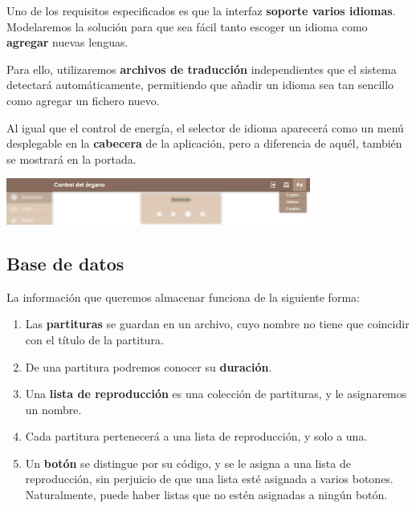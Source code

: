 \documentclass[10pt,a4paper]{article}
\begin{document}
	Uno de los requisitos especificados es que la interfaz \textbf{soporte varios idiomas}. Modelaremos la solución para que sea fácil tanto escoger un idioma como \textbf{agregar} nuevas lenguas.
	
	Para ello, utilizaremos \textbf{archivos de traducción} independientes que el sistema detectará automáticamente, permitiendo que añadir un idioma sea tan sencillo como agregar un fichero nuevo.
	
	Al igual que el control de energía, el selector de idioma aparecerá como un menú desplegable en la \textbf{cabecera} de la aplicación, pero a diferencia de aquél, también se mostrará en la portada.
	
	\begin{center}
		\includegraphics[width=0.75\textwidth]{images/cap_repr_idiomas} 
	\end{center}
	
	
	\subsection{Base de datos}
	\label{subsec:database}
	
	La información que queremos almacenar funciona de la siguiente forma:
	
	\begin{enumerate}
		\item Las \textbf{partituras} se guardan en un archivo, cuyo nombre no tiene que coincidir con el título de la partitura.
		\item De una partitura podremos conocer su \textbf{duración}.
		\item Una \textbf{lista de reproducción} es una colección de partituras, y le asignaremos un nombre.
		\item Cada partitura pertenecerá a una lista de reproducción, y solo a una.
		\item Un \textbf{botón} se distingue por su código, y se le asigna a una lista de reproducción, sin perjuicio de que una lista esté asignada a varios botones. Naturalmente, puede haber listas que no estén asignadas a ningún botón.
	\end{enumerate}
	
\end{document}
